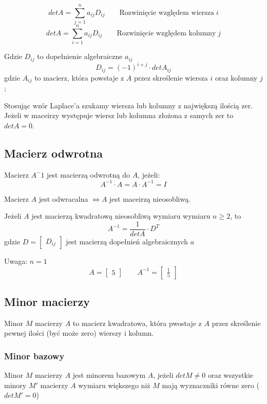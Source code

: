 \documentclass[../Matematyka.tex]{subfiles}
\begin{document}
    \begin{displaymath}
        detA =
        \sum^{n}_{j = 1}
        a_{ij}D_{ij}
        \qquad
        \text{Rozwinięcie względem wiersza} \; i
    \end{displaymath}
    \begin{displaymath}
        detA =
        \sum^{n}_{i = 1}
        a_{ij}D_{ij}
        \qquad
        \text{Rozwinięcie względem kolumny} \; j
    \end{displaymath}

    Gdzie \(D_{ij}\) to dopełnienie algebraiczne \(a_{ij}\)
    \[D_{ij} = (-1)^{i+j} \cdot detA_{ij}\]
    gdzie \(A_{ij}\) to macierz, która powstaje z \(A\) przez skreślenie wiersza \(i\) oraz kolumny \(j\);
    
    Stosując wzór Laplace'a szukamy wiersza lub kolumny z największą ilością zer.
    Jeżeli w maceirzy występuje wiersz lub kolumna złożona z samych zer to \(detA = 0\).

    \subsection{Macierz odwrotna}
    Macierz \(A^-1\) jest macierzą odwrotną do \(A\), jeżeli:
    \[A^{-1} \cdot A = A \cdot A^{-1} = I\]

    Macierz \(A\) jest odwracalna \(\iff A\) jest maceirzą nieosobliwą.

    Jeżeli \(A\) jest macierzą kwadratową nieosobliwą wymiaru wymiaru \(n \geq 2\), to
    \[A^{-1} = \frac{1}{detA} \cdot D^T\]
    gdzie \(D = \begin{bmatrix} D_{ij} \end{bmatrix}\) jest macierzą dopełnień algebraicznych \(a\)

    Uwaga: \(n = 1\)
    \[A = \begin{bmatrix} 5 \end{bmatrix} \qquad A^{-1} = \begin{bmatrix} \frac{1}{5} \end{bmatrix} \]

    \newpage
    \subsection{Minor macierzy}
    Minor \(M\) macierzy \(A\) to macierz kwadratowa, która pwostaje z \(A\) przez skreślenie pewnej ilości (być może zero) wierszy i kolumn.

    \subsubsection{Minor bazowy}
    Minor \(M\) macierzy \(A\) jest minorem bazowym \(A\), jeżeli \(detM \neq 0\) oraz wszystkie minory \(M'\) macierzy \(A\) wymiaru większego niż \(M\) mają wyznaczniki równe zero (\(detM' = 0\))
\end{document}
